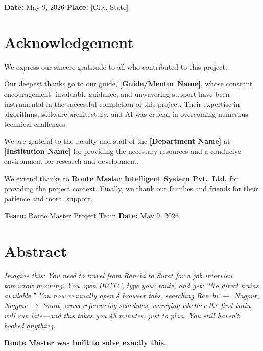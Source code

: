 \documentclass[12pt,a4paper]{report}
\begin{document}
\vfill
\textbf{Date:} May 9, 2026 \hfill \textbf{Place:} [City, State]

\chapter*{Acknowledgement}

We express our sincere gratitude to all who contributed to this project.

Our deepest thanks go to our guide, \textbf{[Guide/Mentor Name]}, whose constant encouragement, invaluable guidance, and unwavering support have been instrumental in the successful completion of this project. Their expertise in algorithms, software architecture, and AI was crucial in overcoming numerous technical challenges.

We are grateful to the faculty and staff of the \textbf{[Department Name]} at \textbf{[Institution Name]} for providing the necessary resources and a conducive environment for research and development.

We extend thanks to \textbf{Route Master Intelligent System Pvt.\ Ltd.} for providing the project context. Finally, we thank our families and friends for their patience and moral support.

\vfill
\textbf{Team:} Route Master Project Team \hfill \textbf{Date:} May 9, 2026

\chapter*{Abstract}

\begin{tcolorbox}[storybox]
\textit{Imagine this: You need to travel from Ranchi to Surat for a job interview tomorrow morning. You open IRCTC, type your route, and get: ``No direct trains available.'' You now manually open 4 browser tabs, searching Ranchi $\to$ Nagpur, Nagpur $\to$ Surat, cross-referencing schedules, worrying whether the first train will run late---and this takes you 45 minutes, just to plan. You still haven't booked anything.}

\medskip
\textbf{Route Master was built to solve exactly this.}
\end{tcolorbox}
\end{document}

